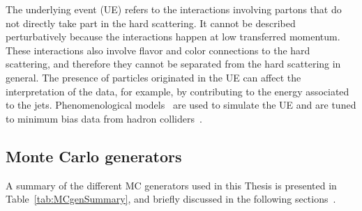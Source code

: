 The underlying event (UE) refers to the interactions involving partons that do not directly take part in the hard scattering.
It cannot be described perturbatively because the interactions happen at low transferred momentum. 
These interactions also involve flavor and color connections to the hard scattering, and therefore they cannot be separated from the hard scattering in general.
The presence of particles originated in the UE can affect the interpretation of the data, for example, by contributing to the energy associated to the jets.
Phenomenological models~\cite{Butterworth:1996zw} are used to simulate the UE and are tuned to minimum bias data from hadron colliders~\cite{Sjostrand:2006za}.


\subsection{Monte Carlo generators}
    \label{subsec:MCgenerators}

A summary of the different MC generators used in this Thesis is presented in Table~\ref{tab:MCgenSummary}, and briefly discussed in the following sections~\cite{Buckley:2011ms, Aad:2010ah}.

